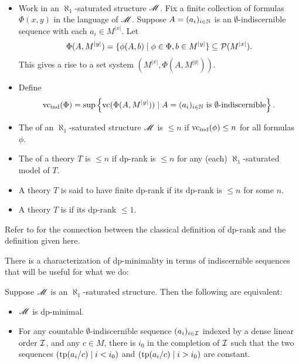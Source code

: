 \begin{Definition} \label{def_dp} \ 
  \begin{itemize}
  \item
    Work in an $\aleph_1$-saturated structure $\mathscr M$.
    Fix a finite collection of formulas $\Phi(x, y)$ in the language of $\mathscr M$.
    Suppose $A = (a_i)_{i \in \mathbb{N}}$ is an $\emptyset$-indiscernible sequence with each $a_i \in M^{|x|}$.
    Let
    \begin{align*}
      \Phi(A, M^{|y|}) = \{\phi(A, b) \mid \phi \in \Phi, b \in M^{|y|}\} \subseteq \mathcal P(M^{|x|}).
    \end{align*}
    This gives a rise to a set system $(M^{|x|}, \Phi(A, M^{|y|}))$.
  \item Define
    \begin{align*}
      \operatorname{vc}_{\operatorname{ind}}(\Phi) = \sup \left\{\operatorname{vc}(\Phi(A, M^{|y|})) \mid A = (a_i)_{i \in \mathbb{N}} \text{ is $\emptyset$-indiscernible}\right\}.
    \end{align*}
  \item The  of an $\aleph_1$-saturated structure $\mathscr M$ is $\leq n$ if $\operatorname{vc}_{\operatorname{ind}}(\phi) \leq n$ for all formulas $\phi$.
  \item The \defn{dp-rank} of a theory $T$ is $\leq n$ if dp-rank is $\leq n$ for any (each) $\aleph_1$-saturated model of $T$.
  \item A theory $T$ is said to have finite dp-rank if its dp-rank is $\leq n$ for some $n$.
  \item A theory $T$ is \defn{dp-minimal} if its dp-rank $\leq 1$.
  \end{itemize}
\end{Definition}

Refer to \cite{guingona} for the connection between the classical definition of dp-rank and the definition given here.

There is a characterization of dp-minimality in terms of indiscernible sequences that will be useful for what we do:
\begin{Lemma} [see Lemma 1.4 in \cite{simon_dp_min}] \label{dp_min_simon}
  Suppose $\mathscr M$ is an $\aleph_1$-saturated structure.
  Then the following are equivalent:
  \begin{itemize}
  \item $\mathscr M$ is dp-minimal.
  \item For any countable $\emptyset$-indiscernible sequence $(a_i)_{i \in \operatorname{\mathcal I}}$ indexed by a dense linear order $\operatorname{\mathcal I}$,
    and any $c \in M$, there is $i_0$ in the completion of $\operatorname{\mathcal I}$
    such that the two sequences $\left(\operatorname{tp}(a_i/c) \mid i < i_0\right)$ and
    $\left(\operatorname{tp}(a_i/c) \mid i > i_0\right)$ are constant.
  \end{itemize}
\end{Lemma}
